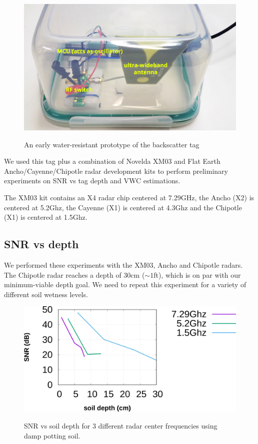 \documentclass[12pt]{article}
\begin{document}
\begin{figure}[h!]
  \centering
  \includegraphics[scale=0.25]{prototype.png}\\
  \caption{An early water-resistant prototype of the backscatter tag}
  \label{figure:prototype}
\end{figure}

We used this tag plus a combination of Novelda XM03 and Flat Earth
Ancho/Cayenne/Chipotle radar development kits to perform preliminary
experiments on SNR vs tag depth and VWC estimations. 

The XM03 kit contains an X4 radar chip centered at 7.29GHz, the Ancho (X2)
is centered at 5.2Ghz, the Cayenne (X1) is centered at 4.3Ghz and the
Chipotle (X1) is centered at 1.5Ghz.

\subsection*{SNR vs depth}

We performed these experiments with the XM03, Ancho and Chipotle
radars. The Chipotle radar reaches a depth of 30cm ($\sim 1$ft), which is on
par with our minimum-viable depth goal. We need to repeat this
experiment for a variety of different soil wetness levels.

\begin{figure}[h!]
  \centering
  \includegraphics[scale=0.75]{../graphs/snr.png}\\
  \caption{SNR vs soil depth for 3 different radar center frequencies
    using damp potting soil.}
  \label{figure:depth}
\end{figure}
\end{document}
